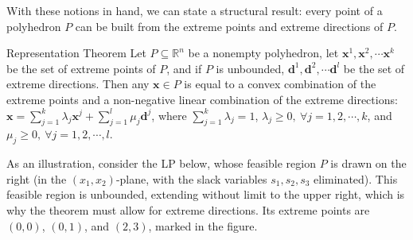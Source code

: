 \medskip
With these notions in hand, we can state a structural result: every point of a polyhedron \( P \) can be built from the extreme points and extreme directions of \( P \).

\begin{theorem}{Representation Theorem}
\label{thm:representation}
 Let \( P \subseteq \mathbb{R}^n \) be a nonempty polyhedron, let $\mathbf{x}^1, \mathbf{x}^2,\cdots \mathbf{x}^k$ be the set of extreme points of $P$, and if $P$ is unbounded, $\mathbf{d}^1, \mathbf{d}^2,\cdots \mathbf{d}^l$ be the set of extreme directions. Then any $\mathbf{x} \in P$ is equal to a convex combination of the extreme points and a non-negative linear combination of the extreme directions: $\mathbf{x} = \sum_{j=1}^k \lambda_j \mathbf{x}^j + \sum_{j=1}^l \mu_j \mathbf{d}^j$, where $\sum_{j=1}^k \lambda_j = 1$, $\lambda_j \ge 0,~\forall  j=1,2,\cdots,k$, and $\mu_j \ge 0,~\forall j=1,2,\cdots,l$.
 \end{theorem}

As an illustration, consider the LP below, whose feasible region \( P \) is drawn on the right (in the \((x_1,x_2)\)-plane, with the slack variables \(s_1, s_2, s_3\) eliminated). This feasible region is unbounded, extending without limit to the upper right, which is why the theorem must allow for extreme directions. Its extreme points are \((0,0)\), \((0,1)\), and \((2,3)\), marked in the figure.

